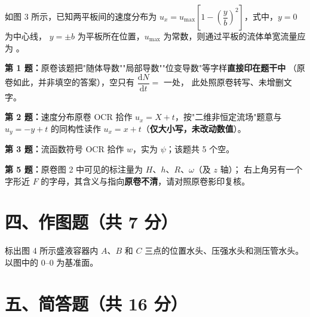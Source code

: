 \begin{ti}
  \item 如图 3 所示，已知两平板间的速度分布为
  $u_x=u_{\max}\left[1-\left(\dfrac{y}{b}\right)^{2}\right]$，式中，$y=0$ 为中心线，
  $y=\pm b$ 为平板所在位置，$u_{\max}$ 为常数，则通过平板的流体单宽流量应为
  \underline{\hspace{3cm}}。\hfill{}
\end{ti}

\begin{tishi}
\textbf{第 1 题：}原卷该题把"随体导数""局部导数""位变导数"等字样\textbf{直接印在题干中}
（原卷如此，并非填空的答案），空只有 $\dfrac{\mathrm{d}N}{\mathrm{d}t}=$ 一处，
此处照原卷转写、未增删文字。

\textbf{第 2 题：}速度分布原卷 OCR 拾作 $u_x=X+t$，按"二维非恒定流场"题意与
$u_y=-y+t$ 的同构性读作 $u_x=x+t$（\textbf{仅大小写，未改动数值}）。

\textbf{第 3 题：}流函数符号 OCR 拾作 $w$，实为 $\psi$；该题共 5 个空。

\textbf{第 5 题：}原卷图 2 中可见的标注量为 $H$、$h$、$R$、$\omega$（及 $z$ 轴）；
右上角另有一个字形近 $F$ 的字母，其含义与指向\textbf{原卷不清}，请对照原卷影印复核。
\end{tishi}

\section{四、作图题（共 7 分）}

\begin{ti}
  \item 标出图 4 所示盛液容器内 $A$、$B$ 和 $C$ 三点的位置水头、压强水头和测压管水头。
  以图中的 $0$--$0$ 为基准面。\hfill{}
\end{ti}

\section{五、简答题（共 16 分）}


